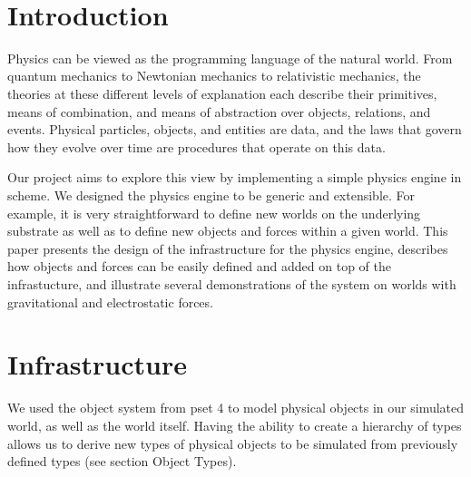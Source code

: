 \documentclass{article}
\title{
    \textbf{\hmwkTitle} \\
    \smallskip
    \normalsize{\hmwkSubtitle} \\
    \hmwkClass \\
    \normalsize{\hmwkClassInstructor} \\
}
\author{\hmwkAuthorName}
\date{}
\begin{document}
\maketitle
\section{Introduction}

Physics can be viewed as the programming language of the natural world. From
quantum mechanics to Newtonian mechanics to relativistic mechanics, the
theories at these different levels of explanation each describe their
primitives, means of combination, and means of abstraction over objects,
relations, and events. Physical particles, objects, and entities are data, and
the laws that govern how they evolve over time are procedures that operate on
this data.

Our project aims to explore this view by implementing a simple physics engine
in scheme. We designed the physics engine to be generic and extensible. For
example, it is very straightforward to define new worlds on the underlying
substrate as well as to define new objects and forces within a given world.
This paper presents the design of the infrastructure for the physics engine,
describes how objects and forces can be easily defined and added on top of the
infrastucture, and illustrate several demonstrations of the system on worlds
with gravitational and electrostatic forces.


\section{Infrastructure}

We used the object system from pset 4 to model physical objects in our
simulated world, as well as the world itself. Having the ability to create a
hierarchy of types allows us to derive new types of physical objects to be
simulated from previously defined types (see section Object Types).



\end{document}
